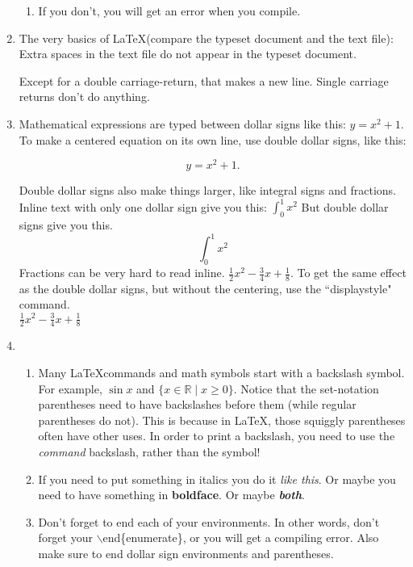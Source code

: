 \documentclass{article} %
\begin{document}
\begin{enumerate}
\begin{enumerate}
\item If you don't, you will get an error when you compile.
\end{enumerate}

\item
The very basics of \LaTeX (compare the typeset document and the text file):\\ %


Extra spaces    in           the text              file do     not    appear   in    the     typeset     document.

Except for a double carriage-return, that makes a new line. 
Single
carriage
returns
don't 
do 
anything.

\item
Mathematical expressions are typed between dollar signs like this: $y=x^2+1$.  To make a centered equation on its own line, use double dollar signs, like this:

$$y=x^2+1.$$

Double dollar signs also make things larger, like integral signs and fractions. Inline text with only one dollar sign give you this: $\int_0^1 x^2$   But double dollar signs give you this.  $$\int_0^1 x^2$$   Fractions can be very hard to read inline. $\frac{1}{2}x^2 - \frac{3}{4}x + \frac{1}{8}$.  To get the same effect as the double dollar signs, but without the centering, use the ``displaystyle" command.\\

 $\displaystyle{\frac{1}{2}x^2 - \frac{3}{4}x + \frac{1}{8}}$  


\item
\begin{enumerate}
	\item Many \LaTeX commands and math symbols start with a backslash symbol.  For example, $\sin x$ and $\{x \in \mathbb{R} \mid x \geq 0\}$.  Notice that the set-notation parentheses need to have backslashes before them (while regular parentheses do not).  This is because in \LaTeX, those squiggly parentheses often have other uses. In order to print a backslash, you need to use the {\em command} backslash, rather than the symbol!

	\item If you need to put something in italics you do it {\em like this}.  Or maybe you need to have something in {\bf boldface}.  Or maybe {\bf \em both}. 

\item Don't forget to end each of your environments.  In other words, don't 
forget your $\backslash$end\{enumerate\}, or you will get a compiling error.  Also make sure to end dollar sign environments and parentheses.
\end{enumerate}




\end{enumerate}
\end{document}
